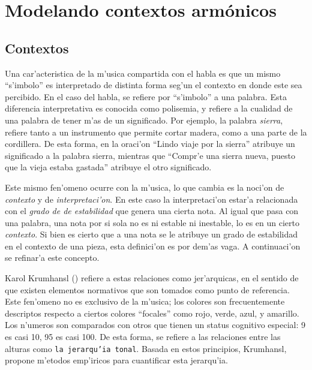 
\section{Modelando contextos arm\'onicos}
\subsection{Contextos}
Una car'acteristica de la m'usica compartida con el habla es que un mismo ``s'imbolo'' es interpretado de distinta forma seg'un el contexto
en donde este sea percibido. En el caso del habla, se refiere por ``s'imbolo'' a una palabra. Esta diferencia interpretativa es conocida 
como polisemia, y refiere a la cualidad de una palabra de tener m'as de un significado. Por ejemplo, la palabra \emph{sierra}, refiere
tanto a un instrumento que permite cortar madera, como a una parte de la cordillera. De esta forma, en la oraci'on 
``Lindo viaje por la sierra'' atribuye un significado a la palabra sierra, mientras que ``Compr'e una sierra nueva, puesto que la vieja 
estaba gastada'' atribuye el otro significado. 

Este mismo fen'omeno ocurre con la m'usica, lo que cambia es la noci'on de \emph{contexto} y de \emph{interpretaci'on}. En este caso
la interpretaci'on estar'a relacionada con el \emph{grado de de estabilidad} que genera una cierta nota. Al igual que pasa con una palabra,
una nota por si sola no es ni estable ni inestable, lo es en un cierto \emph{contexto}. Si bien es cierto que a una nota
se le atribuye un grado de estabilidad en el contexto de una pieza, esta definici'on es por dem'as vaga. A continuaci'on se refinar'a
este concepto.

Karol Krumhansl (\cita) refiere a estas relaciones como jer'arquicas, en el sentido de que existen elementos normativos que son tomados como punto de referencia. Este 
fen'omeno no es exclusivo de la m'usica; los colores son frecuentemente descriptos respecto a ciertos colores ``focales'' como rojo, verde, azul, y amarillo. Los 
n'umeros son comparados con otros que tienen un status cognitivo especial: 9 es casi 10, 95 es casi 100. De esta forma, se refiere a las relaciones entre las alturas como
\texttt{la jerarqu'ia tonal}. Basada en estos principios, Krumhansl, propone m'etodos emp'iricos para cuantificar esta jerarqu'ia.



